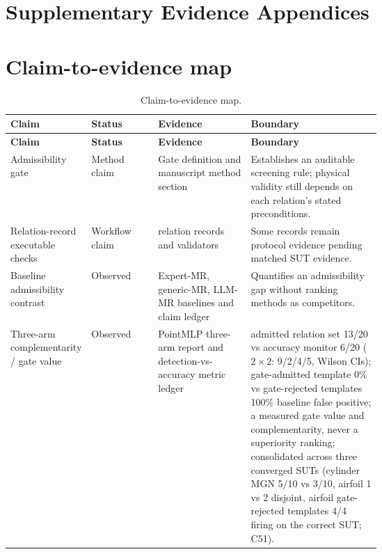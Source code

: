 \documentclass[preprint,12pt]{elsarticle}
\begin{document}
\section*{Supplementary Evidence Appendices}

\renewcommand{\thetable}{A\arabic{table}}
\setcounter{table}{0}
\section{Claim-to-evidence map}
\label{app:claim-evidence}

{
\scriptsize
\setlength{\tabcolsep}{1.5pt}
\begin{xltabular}{\linewidth}{@{}>{\raggedright\arraybackslash}p{0.19\linewidth}>{\raggedright\arraybackslash}p{0.18\linewidth}>{\raggedright\arraybackslash}p{0.25\linewidth}Y@{}}
\caption{Claim-to-evidence map.}\label{tab:claim-evidence}\\
\toprule
\textbf{Claim} & \textbf{Status} & \textbf{Evidence} & \textbf{Boundary} \\
\midrule
\endfirsthead
\toprule
\textbf{Claim} & \textbf{Status} & \textbf{Evidence} & \textbf{Boundary} \\
\midrule
\endhead
\bottomrule
\endlastfoot
Admissibility gate & Method claim & Gate definition and manuscript method section & Establishes an auditable screening rule; physical validity still depends on each relation's stated preconditions. \\
Relation-record executable checks & Workflow claim & relation records and validators & Some records remain protocol evidence pending matched SUT evidence. \\
Baseline admissibility contrast & Observed & Expert-MR, generic-MR, LLM-MR baselines and claim ledger & Quantifies an admissibility gap without ranking methods as competitors. \\
Three-arm complementarity / gate value & Observed & PointMLP three-arm report and detection-vs-accuracy metric ledger & admitted relation set 13/20 vs accuracy monitor 6/20 ($2\times2$: 9/2/4/5, Wilson CIs); gate-admitted template 0\% vs gate-rejected templates 100\% baseline false positive; a measured gate value and complementarity, never a superiority ranking; consolidated across three converged SUTs (cylinder MGN 5/10 vs 3/10, airfoil 1 vs 2 disjoint, airfoil gate-rejected templates 4/4 firing on the correct SUT; C51). \\

\end{xltabular}}
\end{document}
